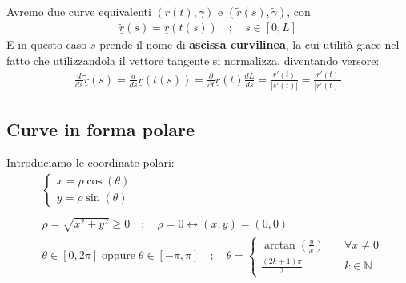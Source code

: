 Avremo due curve equivalenti $(r(t),\gamma)$ e $(\tilde{r}(s),\tilde{\gamma})$, con
\begin{align}
\tilde{\underline{r}}(s)=\underline{r}(t(s)) \quad ; \quad s \in [0,L]
\end{align}
E in questo caso $s$ prende il nome di \textbf{ascissa curvilinea}, la cui utilità giace nel fatto che utilizzandola il vettore tangente si normalizza, diventando versore:
\begin{align}
\frac{d}{ds}\tilde{\underline{r}}(s)= \frac{d}{ds}\underline{r}(t(s))= \frac{\partial}{\partial t}\underline{r}(t) \frac{dL}{ds}= \frac{\underline{r}'(t)}{|s'(t)|}=\frac{\underline{r}'(t)}{|r'(t)|}
\end{align}

\newpage

\subsection{Curve in forma polare}

Introduciamo le coordinate polari:
\begin{align}
{}&\left\{
\begin{array}{cc}
x=\rho \cos(\theta)\\
y=\rho \sin(\theta)
\end{array}
\right.\\
\nonumber \\
&\rho=\sqrt{x^2 + y^2} \geq 0 \quad ;\quad \rho=0\leftrightarrow (x,y)=(0,0) \\
&\theta \in [0,2\pi] \; \text{oppure} \; \theta \in [-\pi,\pi] \quad ; \quad \theta=
\left\{
\begin{array}{cc}
\arctan\left(\frac{y}{x}\right) \quad {}&\forall x \neq 0 \\
\frac{(2k+1)\pi}{2} \quad &k\in \mathbb{N} 
\end{array}
\right.
\end{align}

\begin{figure}[!htb]
\end{figure}


